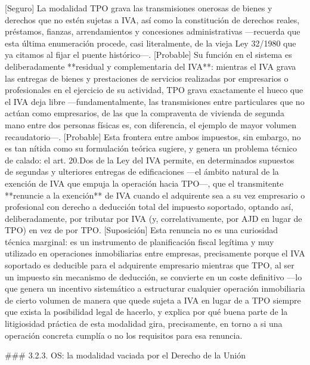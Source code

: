 \documentclass[10pt,a4paper]{article}
\begin{document}
[Seguro] La modalidad TPO grava las transmisiones onerosas de bienes y derechos que no estén sujetas a IVA, así como la constitución de derechos reales, préstamos, fianzas, arrendamientos y concesiones administrativas —recuerda que esta última enumeración procede, casi literalmente, de la vieja Ley 32/1980 que ya citamos al fijar el puente histórico—. [Probable] Su función en el sistema es deliberadamente **residual y complementaria del IVA**: mientras el IVA grava las entregas de bienes y prestaciones de servicios realizadas por empresarios o profesionales en el ejercicio de su actividad, TPO grava exactamente el hueco que el IVA deja libre —fundamentalmente, las transmisiones entre particulares que no actúan como empresarios, de las que la compraventa de vivienda de segunda mano entre dos personas físicas es, con diferencia, el ejemplo de mayor volumen recaudatorio—. [Probable] Esta frontera entre ambos impuestos, sin embargo, no es tan nítida como su formulación teórica sugiere, y genera un problema técnico de calado: el art. 20.Dos de la Ley del IVA permite, en determinados supuestos de segundas y ulteriores entregas de edificaciones —el ámbito natural de la exención de IVA que empuja la operación hacia TPO—, que el transmitente **renuncie a la exención** de IVA cuando el adquirente sea a su vez empresario o profesional con derecho a deducción total del impuesto soportado, optando así, deliberadamente, por tributar por IVA (y, correlativamente, por AJD en lugar de TPO) en vez de por TPO. [Suposición] Esta renuncia no es una curiosidad técnica marginal: es un instrumento de planificación fiscal legítima y muy utilizado en operaciones inmobiliarias entre empresas, precisamente porque el IVA soportado es deducible para el adquirente empresario mientras que TPO, al ser un impuesto sin mecanismo de deducción, se convierte en un coste definitivo —lo que genera un incentivo sistemático a estructurar cualquier operación inmobiliaria de cierto volumen de manera que quede sujeta a IVA en lugar de a TPO siempre que exista la posibilidad legal de hacerlo, y explica por qué buena parte de la litigiosidad práctica de esta modalidad gira, precisamente, en torno a si una operación concreta cumplía o no los requisitos para esa renuncia.

### 3.2.3. OS: la modalidad vaciada por el Derecho de la Unión
\end{document}
